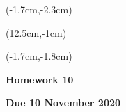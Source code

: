 \documentclass[12pt, oneside]{article}
\begin{document}
\begin{textblock*}{4cm}(-1.7cm,-2.3cm)
\end{textblock*}

\begin{textblock*}{8cm}(12.5cm,-1cm)
\end{textblock*}
\begin{textblock*}{13.5cm}(-1.7cm,-1.8cm)
\end{textblock*}

\vspace{1cm}

\begin{center}
\textbf{\Large Homework 10}

\textbf{Due 10 November 2020}
\end{center}
\end{document}

